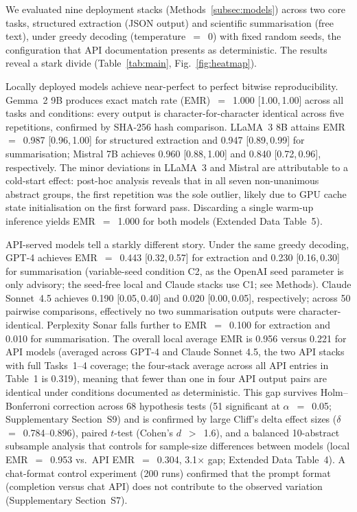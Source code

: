 \documentclass[sn-nature]{sn-jnl}
\begin{document}
We evaluated nine deployment stacks (Methods~\ref{subsec:models}) across two core tasks, structured extraction (JSON output) and scientific summarisation (free text), under greedy decoding (temperature~$=$~0) with fixed random seeds, the configuration that API documentation presents as deterministic.
The results reveal a stark divide (Table~\ref{tab:main}, Fig.~\ref{fig:heatmap}).

Locally deployed models achieve near-perfect to perfect bitwise reproducibility.
Gemma~2 9B produces exact match rate (EMR)~$=$~1.000 [1.00,\,1.00] across all tasks and conditions: every output is character-for-character identical across five repetitions, confirmed by SHA-256 hash comparison.
LLaMA~3 8B attains EMR~$=$~0.987 [0.96,\,1.00] for structured extraction and 0.947 [0.89,\,0.99] for summarisation; Mistral 7B achieves 0.960 [0.88,\,1.00] and 0.840 [0.72,\,0.96], respectively.
The minor deviations in LLaMA~3 and Mistral are attributable to a cold-start effect: post-hoc analysis reveals that in all seven non-unanimous abstract groups, the first repetition was the sole outlier, likely due to GPU cache state initialisation on the first forward pass.
Discarding a single warm-up inference yields EMR~$=$~1.000 for both models (Extended Data Table~5).

API-served models tell a starkly different story.
Under the same greedy decoding, GPT-4 achieves EMR~$=$~0.443 [0.32,\,0.57] for extraction and 0.230 [0.16,\,0.30] for summarisation (variable-seed condition C2, as the OpenAI seed parameter is only advisory; the seed-free local and Claude stacks use C1; see Methods).
Claude Sonnet~4.5 achieves 0.190 [0.05,\,0.40] and 0.020 [0.00,\,0.05], respectively; across 50 pairwise comparisons, effectively no two summarisation outputs were character-identical.
Perplexity Sonar falls further to EMR~$=$~0.100 for extraction and 0.010 for summarisation.
The overall local average EMR is 0.956 versus 0.221 for API models (averaged across GPT-4 and Claude Sonnet 4.5, the two API stacks with full Tasks~1--4 coverage; the four-stack average across all API entries in Table~1 is 0.319), meaning that fewer than one in four API output pairs are identical under conditions documented as deterministic.
This gap survives Holm--Bonferroni correction across 68 hypothesis tests (51 significant at $\alpha$~$=$~0.05; Supplementary Section~S9) and is confirmed by large Cliff's delta effect sizes ($\delta$~$=$~0.784--0.896), paired $t$-test (Cohen's $d$~$>$~1.6), and a balanced 10-abstract subsample analysis that controls for sample-size differences between models (local EMR~$=$~0.953 vs.\ API EMR~$=$~0.304, 3.1$\times$ gap; Extended Data Table~4).
A chat-format control experiment (200 runs) confirmed that the prompt format (completion versus chat API) does not contribute to the observed variation (Supplementary Section~S7).
\end{document}
